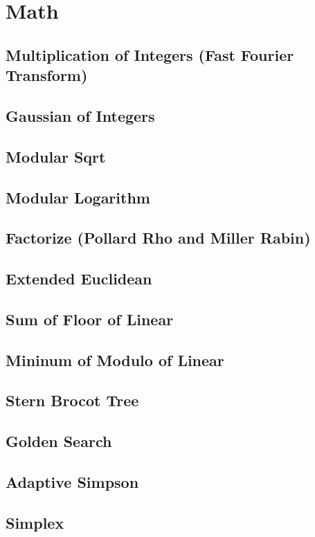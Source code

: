 \section{Math}
\subsection{Multiplication of Integers (Fast Fourier Transform)}


\subsection{Gaussian of Integers}


\subsection{Modular Sqrt}


\subsection{Modular Logarithm}


\subsection{Factorize (Pollard Rho and Miller Rabin)}


\subsection{Extended Euclidean}


\subsection{Sum of Floor of Linear}


\subsection{Mininum of Modulo of Linear}


\subsection{Stern Brocot Tree}


\subsection{Golden Search}


\subsection{Adaptive Simpson}


\subsection{Simplex}
